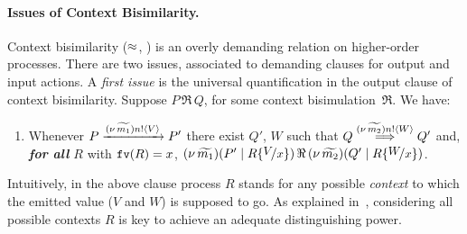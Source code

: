 

\paragraph{Issues of Context Bisimilarity.}
Context bisimilarity ($\approx$, ) is an overly demanding relation on higher-order processes. 
There are two issues, associated to demanding clauses for output and input actions. 
A \emph{first issue} %
is 
the universal quantification in the output clause of context bisimilarity.
Suppose $P \,\Re\, Q$, for some context bisimulation~$\Re$. We have:
\begin{enumerate}[$(\star)$]
	\item	Whenever 
		$P \xrightarrow{(\nu\, \widetilde{m_1}) n ! \langle V \rangle} P'$
		there exist
		$Q'$, $W$
		such that 
		$Q \stackrel{(\nu\, \widetilde{m_2}) n ! \langle W \rangle}{\Longrightarrow} Q'$
		and, \\ \emph{\textbf{for all} $R$}  with $\mathtt{fv}(R)=x$, 
		$\newsp{\widetilde{m_1}}{P' \Par R\subst{V}{x}} \,\Re\, \newsp{\widetilde{m_2}}{Q' \Par R\subst{W}{x}}$.
\end{enumerate}
Intuitively, 
in the above clause process $R$ stands for any possible \emph{context} to which the emitted value
($V$ and $W$) is supposed to go. 
As explained in~\cite{San96H}, considering 
all possible contexts $R$ is key to achieve an adequate distinguishing power.

